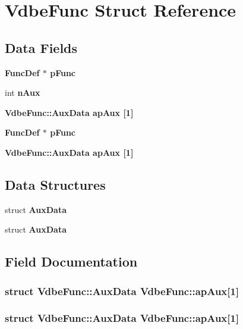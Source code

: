 \section{Vdbe\-Func Struct Reference}
\label{structVdbeFunc}
\subsection*{Data Fields}
\begin{CompactItemize}
\item 
\bf{Func\-Def} $\ast$ \bf{p\-Func}
\item 
int \bf{n\-Aux}
\item 
\bf{Vdbe\-Func::Aux\-Data} \bf{ap\-Aux} [1]
\item 
\bf{Func\-Def} $\ast$ \bf{p\-Func}
\item 
\bf{Vdbe\-Func::Aux\-Data} \bf{ap\-Aux} [1]
\end{CompactItemize}
\subsection*{Data Structures}
\begin{CompactItemize}
\item 
struct \bf{Aux\-Data}
\item 
struct \bf{Aux\-Data}
\end{CompactItemize}


\subsection{Field Documentation}
\subsubsection{\setlength{\rightskip}{0pt plus 5cm}struct \bf{Vdbe\-Func::Aux\-Data}  \bf{Vdbe\-Func::ap\-Aux}[1]}\label{structVdbeFunc_82e92a073f8205d2eda0f5b20367112d}


\subsubsection{\setlength{\rightskip}{0pt plus 5cm}struct \bf{Vdbe\-Func::Aux\-Data}  \bf{Vdbe\-Func::ap\-Aux}[1]}\label{structVdbeFunc_82e92a073f8205d2eda0f5b20367112d}


